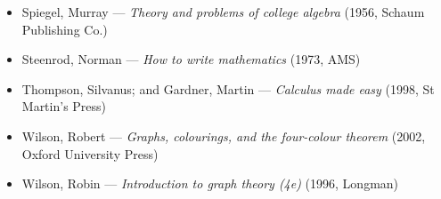 \begin{itemize}[noitemsep]
  \item Spiegel, Murray --- \emph{Theory and problems of college algebra} (1956, Schaum Publishing Co.)
  \item Steenrod, Norman --- \emph{How to write mathematics} (1973, AMS)
  \item Thompson, Silvanus; and Gardner, Martin --- \emph{Calculus made easy} (1998, St Martin's Press)
  \item Wilson, Robert --- \emph{Graphs, colourings, and the four-colour theorem} (2002, Oxford University Press)
  \item Wilson, Robin --- \emph{Introduction to graph theory (4e)} (1996, Longman)
\end{itemize}


